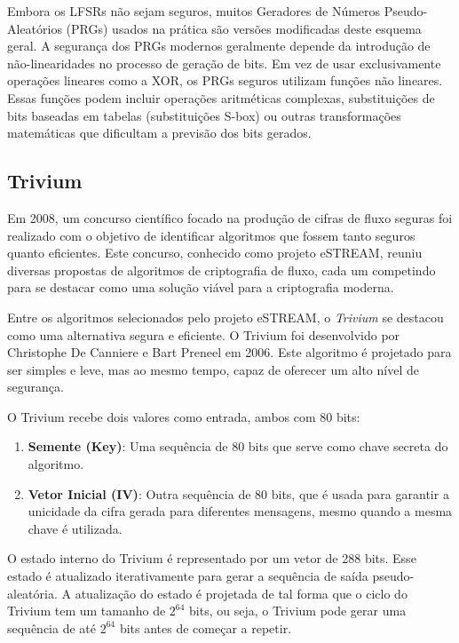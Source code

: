 Embora os LFSRs não sejam seguros, muitos Geradores de Números Pseudo-Aleatórios (PRGs) usados na prática são versões modificadas deste esquema geral.
A segurança dos PRGs modernos geralmente depende da introdução de não-linearidades no processo de geração de bits.
Em vez de usar exclusivamente operações lineares como a XOR, os PRGs seguros utilizam funções não lineares.
Essas funções podem incluir operações aritméticas complexas, substituições de bits baseadas em tabelas (substituições S-box) ou outras transformações matemáticas que dificultam a previsão dos bits gerados.

\subsection{Trivium}
\label{sec:trivium}

Em 2008, um concurso científico focado na produção de cifras de fluxo seguras foi realizado com o objetivo de identificar algoritmos que fossem tanto seguros quanto eficientes.
Este concurso, conhecido como projeto eSTREAM, reuniu diversas propostas de algoritmos de criptografia de fluxo, cada um competindo para se destacar como uma solução viável para a criptografia moderna.

Entre os algoritmos selecionados pelo projeto eSTREAM, o {\em Trivium} \cite{DeCanniere06} se destacou como uma alternativa segura e eficiente.
O Trivium foi desenvolvido por Christophe De Canniere e Bart Preneel em 2006.
Este algoritmo é projetado para ser simples e leve, mas ao mesmo tempo, capaz de oferecer um alto nível de segurança.

O Trivium recebe dois valores como entrada, ambos com 80 bits:
\begin{enumerate}
    \item \textbf{Semente (Key)}: Uma sequência de 80 bits que serve como chave secreta do algoritmo.
    \item \textbf{Vetor Inicial (IV)}: Outra sequência de 80 bits, que é usada para garantir a unicidade da cifra gerada para diferentes mensagens, mesmo quando a mesma chave é utilizada.
\end{enumerate}

O estado interno do Trivium é representado por um vetor de 288 bits.
Esse estado é atualizado iterativamente para gerar a sequência de saída pseudo-aleatória.
A atualização do estado é projetada de tal forma que o ciclo do Trivium tem um tamanho de $2^{64}$ bits, ou seja, o Trivium pode gerar uma sequência de até $2^{64}$ bits antes de começar a repetir.

